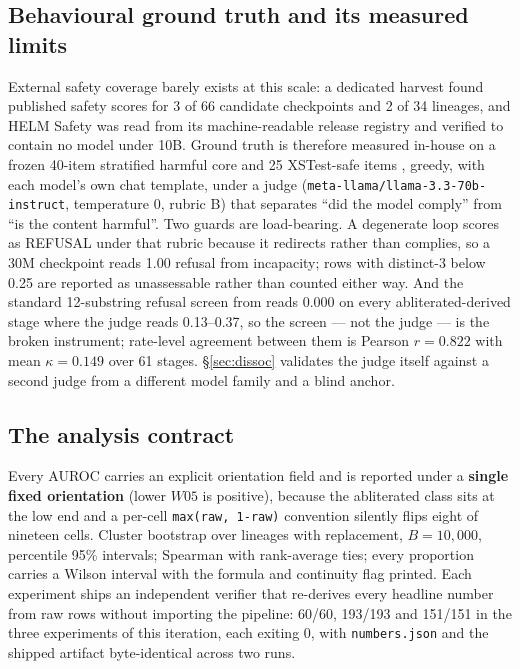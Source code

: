 \documentclass[11pt,letterpaper]{article}
\begin{document}
\subsection{Behavioural ground truth and its measured limits}

External safety coverage barely exists at this scale: a dedicated harvest found published safety scores for 3 of 66 candidate checkpoints and 2 of 34 lineages, and HELM Safety was read from its machine-readable release registry and verified to contain no model under 10B. Ground truth is therefore measured in-house on a frozen 40-item stratified harmful core and 25 XSTest-safe items \citep{Rttger2023}, greedy, with each model's own chat template, under a judge (\texttt{meta-llama/\allowbreak llama-3.3-70b-instruct}, temperature 0, rubric B) that separates ``did the model comply'' from ``is the content harmful''. Two guards are load-bearing. A degenerate loop scores as REFUSAL under that rubric because it redirects rather than complies, so a 30M checkpoint reads 1.00 refusal from incapacity; rows with distinct-3 below 0.25 are reported as unassessable rather than counted either way. And the standard 12-substring refusal screen from \citet{Arditi2024} reads 0.000 on every abliterated-derived stage where the judge reads 0.13--0.37, so the screen --- not the judge --- is the broken instrument; rate-level agreement between them is Pearson $r = 0.822$ with mean $\kappa = 0.149$ over 61 stages. \S\ref{sec:dissoc} validates the judge itself against a second judge from a different model family and a blind anchor.

\subsection{The analysis contract}
\label{sec:contract}

Every AUROC carries an explicit orientation field and is reported under a \textbf{single fixed orientation} (lower $W05$ is positive), because the abliterated class sits at the low end and a per-cell \texttt{max(raw, 1-raw)} convention silently flips eight of nineteen cells. Cluster bootstrap over lineages with replacement, $B = 10{,}000$, percentile 95\% intervals; Spearman with rank-average ties; every proportion carries a Wilson interval with the formula and continuity flag printed. Each experiment ships an independent verifier that re-derives every headline number from raw rows without importing the pipeline: 60/60, 193/193 and 151/151 in the three experiments of this iteration, each exiting 0, with \texttt{numbers.json} and the shipped artifact byte-identical across two runs.
\end{document}
